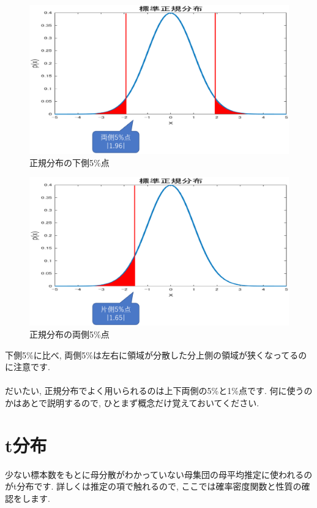 \documentclass[11pt,a4paper]{ujreport} 	%
\begin{document}
\begin{figure}[H]
\label{im:upper}
  \centering
  \includegraphics[width=120mm]{../figures/oneside-t.eps}
  \caption{正規分布の下側5\%点}
\end{figure}

\begin{figure}[H]
\label{im:bilateral}
  \centering
  \includegraphics[width=120mm]{../figures/twoside-t.eps}
  \caption{正規分布の両側5\%点}
\end{figure}

下側5\%に比べ, 両側5\%は左右に領域が分散した分上側の領域が狭くなってるのに注意です. \\
\\

だいたい, 正規分布でよく用いられるのは上下両側の5\%と1\%点です. 何に使うのかはあとで説明するので, ひとまず概念だけ覚えておいてください.

\section{t分布}
少ない標本数をもとに母分散がわかっていない母集団の母平均推定に使われるのがt分布です. 詳しくは推定の項で触れるので, ここでは確率密度関数と性質の確認をします.
\end{document}
